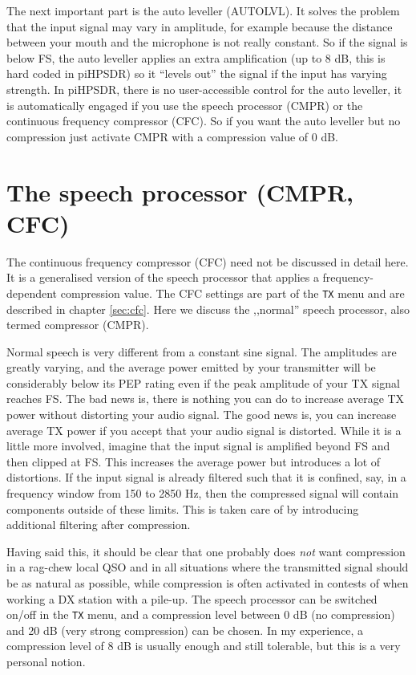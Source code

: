 \documentclass[12pt]{book}
\def\bltt#1{\texttt{\color{blue}#1}}
\def\pH{pi\-HPSDR\xspace}
\begin{document}
The next important part is the auto leveller (AUTOLVL). It solves the problem that the input
signal may vary in amplitude, for example because the distance between your mouth and the microphone is
not really constant. So if the signal is below FS, the auto leveller applies an extra amplification (up
to 8 dB, this is hard coded in \pH) so it ``levels out'' the signal if the input has varying strength.
In \pH, there is no user-accessible control for the auto leveller, it is automatically engaged if you
use the speech processor (CMPR) or the continuous frequency compressor (CFC).  So if you want the auto
leveller but no compression just activate CMPR with a compression value of 0 dB.

\section{The speech processor (CMPR, CFC)}

The continuous frequency compressor (CFC) need not be discussed in detail here.
It is a generalised version of the speech processor
that applies a frequency-dependent compression value. The CFC settings are part of the \bltt{TX} menu
and are described in chapter \ref{sec:cfc}. Here we discuss the ,,normal'' speech processor,
also termed compressor (CMPR).

Normal speech is very different from a constant sine signal. The amplitudes are greatly varying, and
the average power emitted by your transmitter will be considerably below its PEP rating even if the
peak amplitude of your TX signal reaches FS. The bad news is, there is nothing you can do to increase
average TX power without distorting your audio signal. The good news is, you can increase average TX
power if you accept that your audio signal is distorted. While it is a little more involved, imagine
that the input signal is amplified beyond FS and then clipped at FS. This increases the average power
but introduces a lot of distortions. If the input signal is already filtered such that it is confined,
say, in a frequency window from 150 to 2850 Hz, then the compressed signal will contain components outside
of these limits. This is taken care of by introducing additional filtering after compression.

Having said this, it should be clear that one probably does \textit{not} want compression in a rag-chew
local QSO and in all situations where the transmitted signal should be as natural as possible, while
compression is often activated in contests of when working a DX station with a pile-up. The
speech processor can be switched on/off in the \bltt{TX} menu, and a compression level between 0 dB
(no compression) and 20 dB (very strong compression) can be chosen. In my  experience, a compression
level of 8 dB is usually enough and still tolerable, but this is a very personal notion.
\end{document}
